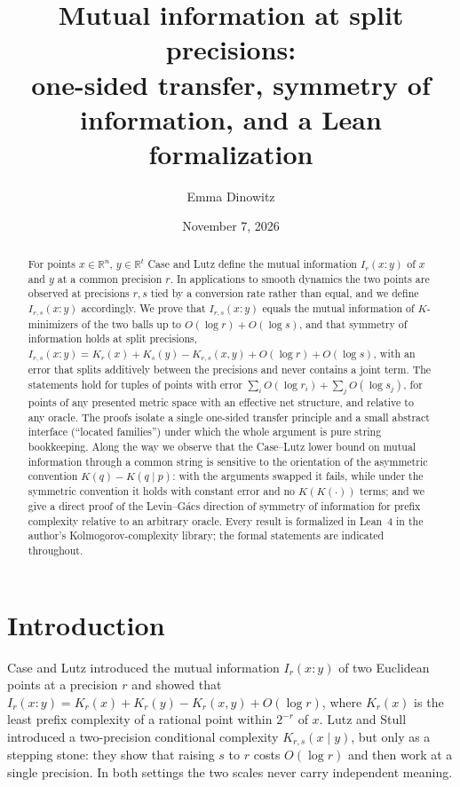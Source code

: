 \documentclass[11pt]{amsart}
\title[Mutual information at split precisions]{Mutual information at split precisions:\\ one-sided transfer, symmetry of information, and a Lean formalization}
\author{Emma Dinowitz}
\date{November 7, 2026}
\theoremstyle{definition}
\newcommand{\R}{\mathbb{R}}
\begin{document}
\begin{abstract}
For points $x\in\R^n$, $y\in\R^t$ Case and Lutz define the mutual information $I_r(x:y)$ of $x$ and $y$ at a common precision $r$.  In applications to smooth dynamics the two points are observed at precisions $r,s$ tied by a conversion rate rather than equal, and we define $I_{r,s}(x:y)$ accordingly.  We prove that $I_{r,s}(x:y)$ equals the mutual information of $K$-minimizers of the two balls up to $O(\log r)+O(\log s)$, and that symmetry of information holds at split precisions,
$I_{r,s}(x:y)=K_r(x)+K_s(y)-K_{r,s}(x,y)+O(\log r)+O(\log s)$, with an error that splits additively between the precisions and never contains a joint term.  The statements hold for tuples of points with error $\sum_i O(\log r_i)+\sum_j O(\log s_j)$, for points of any presented metric space with an effective net structure, and relative to any oracle.  The proofs isolate a single one-sided transfer principle and a small abstract interface (``located families'') under which the whole argument is pure string bookkeeping.  Along the way we observe that the Case--Lutz lower bound on mutual information through a common string is sensitive to the orientation of the asymmetric convention $K(q)-K(q\mid p)$: with the arguments swapped it fails, while under the symmetric convention it holds with constant error and no $K(K(\cdot))$ terms; and we give a direct proof of the Levin--G\'acs direction of symmetry of information for prefix complexity relative to an arbitrary oracle.  Every result is formalized in Lean~4 in the author's Kolmogorov-complexity library; the formal statements are indicated throughout.
\end{abstract}

\maketitle

\section{Introduction}

Case and Lutz \cite{CaseLutz} introduced the mutual information $I_r(x:y)$ of two Euclidean points at a precision $r$ and showed that $I_r(x:y)=K_r(x)+K_r(y)-K_r(x,y)+O(\log r)$, where $K_r(x)$ is the least prefix complexity of a rational point within $2^{-r}$ of $x$.  Lutz and Stull \cite{LutzStull} introduced a two-precision conditional complexity $K_{r,s}(x\mid y)$, but only as a stepping stone: they show that raising $s$ to $r$ costs $O(\log r)$ and then work at a single precision.  In both settings the two scales never carry independent meaning.
\end{document}
